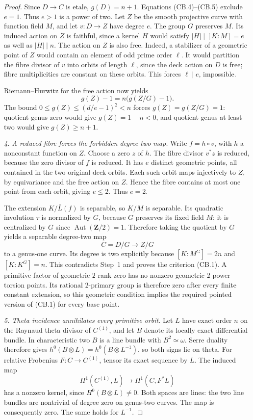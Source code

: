 \documentclass[11pt,a4paper]{article}
\begin{document}
\begin{proof}
Since $D\to C$ is etale, $g(D)=n+1$. Equations (CB.4)--(CB.5)
exclude $e=1$. Thus $e>1$ is a power of two. Let $Z$ be the smooth
projective curve with function field $M$, and let $v:D\to Z$ have
degree $e$. The group $G$ preserves $M$. Its induced action on $Z$
is faithful, since a kernel $H$ would satisfy
$|H|\mid[K:M]=e$ as well as $|H|\mid n$.
The action on $Z$ is also free. Indeed, a stabilizer of a geometric
point of $Z$ would contain an element of odd prime order $\ell$.
It would partition the fibre divisor of $v$ into orbits of length
$\ell$, since the deck action on $D$ is free; fibre multiplicities
are constant on these orbits. This forces $\ell\mid e$, impossible.

Riemann--Hurwitz for the free action now yields
\[
                    g(Z)-1=n\bigl(g(Z/G)-1\bigr).
\]
The bound $0\le g(Z)\le(d/e-1)^2<n$ forces
$g(Z)=g(Z/G)=1$: quotient genus zero would give $g(Z)=1-n<0$,
and quotient genus at least two would give $g(Z)\ge n+1$.

\emph{4. A reduced fibre forces the forbidden degree-two map.}
Write $f=h\circ v$, with $h$ a nonconstant function on $Z$.
Choose a zero $z$ of $h$. The fibre divisor $v^*z$ is reduced,
because the zero divisor of $f$ is reduced. It has $e$ distinct
geometric points, all contained in the two original deck orbits.
Each such orbit maps injectively to $Z$, by equivariance and the
free action on $Z$. Hence the fibre contains at most one point from
each orbit, giving $e\le2$. Thus $e=2$.

The extension $K/\overline L(f)$ is separable, so $K/M$ is separable.
Its quadratic involution $\tau$ is normalized by $G$, because $G$
preserves its fixed field $M$; it is centralized by $G$ since
$\operatorname{Aut}(\mathbf Z/2)=1$. Therefore taking the quotient
by $G$ yields a separable degree-two map
\[
                  C=D/G\longrightarrow Z/G
\]
to a genus-one curve. Its degree is two explicitly because
$[K:M^G]=2n$ and $[K:K^G]=n$.
This contradicts Step~1 and proves the
criterion (CB.1). A primitive factor of geometric $2$-rank zero
has no nonzero geometric $2$-power torsion points. Its rational
$2$-primary group is therefore zero after every finite constant
extension, so this geometric condition implies the required
pointed version of (CB.1) for every base point.

\emph{5. Theta incidence annihilates every primitive orbit.}
Let $L$ have exact order $n$ on the Raynaud theta divisor of
$C^{(1)}$, and let $B$ denote its locally exact differential bundle.
In characteristic two $B$ is a line bundle with $B^2\simeq\omega$.
Serre duality therefore gives
$h^0(B\otimes L)=h^0(B\otimes L^{-1})$, so both signs lie on theta.
For relative Frobenius $F:C\to C^{(1)}$, tensor its exact sequence
by $L$. The induced map
\[
 H^1(C^{(1)},L)\longrightarrow H^1(C,F^*L)
\]
has a nonzero kernel, since $H^0(B\otimes L)\ne0$.
Both spaces are lines: the two line bundles are nontrivial of
degree zero on genus-two curves. The map is consequently zero.
The same holds for $L^{-1}$.


\end{proof}
\end{document}

